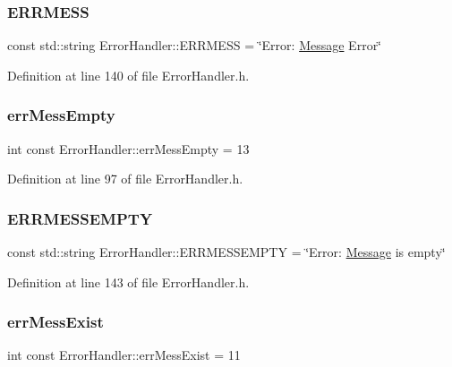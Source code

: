 \subsubsection{\texorpdfstring{ERRMESS}{ERRMESS}}
{\footnotesize\ttfamily const std\+::string Error\+Handler\+::\+E\+R\+R\+M\+E\+SS = \char`\"{}Error\+: \mbox{\hyperlink{classMessage}{Message}} Error\char`\"{}\hspace{0.3cm}{\ttfamily [static]}}



Definition at line 140 of file Error\+Handler.\+h.

\mbox{\label{classErrorHandler_add483ce97592710530c6f746c99c598d}} 
\subsubsection{\texorpdfstring{errMessEmpty}{errMessEmpty}}
{\footnotesize\ttfamily int const Error\+Handler\+::err\+Mess\+Empty = 13\hspace{0.3cm}{\ttfamily [static]}}



Definition at line 97 of file Error\+Handler.\+h.

\mbox{\label{classErrorHandler_a28d8ef2ee23112d4895dd60788c1b152}} 
\subsubsection{\texorpdfstring{ERRMESSEMPTY}{ERRMESSEMPTY}}
{\footnotesize\ttfamily const std\+::string Error\+Handler\+::\+E\+R\+R\+M\+E\+S\+S\+E\+M\+P\+TY = \char`\"{}Error\+: \mbox{\hyperlink{classMessage}{Message}} is empty\char`\"{}\hspace{0.3cm}{\ttfamily [static]}}



Definition at line 143 of file Error\+Handler.\+h.

\mbox{\label{classErrorHandler_a94d4ea423c97ff7a4784ff0043731783}} 
\subsubsection{\texorpdfstring{errMessExist}{errMessExist}}
{\footnotesize\ttfamily int const Error\+Handler\+::err\+Mess\+Exist = 11\hspace{0.3cm}{\ttfamily [static]}}




